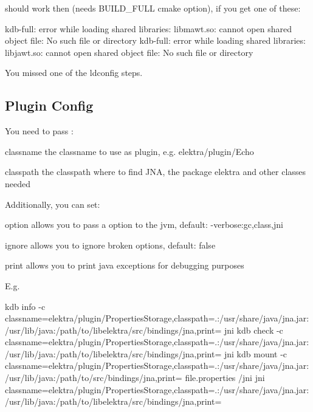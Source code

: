 should work then (needs B\+U\+I\+L\+D\+\_\+\+F\+U\+LL cmake option), if you get one of these\+: \begin{DoxyVerb}kdb-full: error while loading shared libraries: libmawt.so: cannot open shared object file: No such file or directory
kdb-full: error while loading shared libraries: libjawt.so: cannot open shared object file: No such file or directory
\end{DoxyVerb}


You missed one of the ldconfig steps.

\subsection*{Plugin Config}

You need to pass \+:
\begin{DoxyItemize}
\item classname the classname to use as plugin, e.\+g. {\ttfamily elektra/plugin/\+Echo}
\item classpath the classpath where to find J\+NA, the package elektra and other classes needed
\end{DoxyItemize}

Additionally, you can set\+:


\begin{DoxyItemize}
\item option allows you to pass a option to the jvm, default\+: {\ttfamily -\/verbose\+:gc,class,jni}
\item ignore allows you to ignore broken options, default\+: {\ttfamily false}
\item print allows you to print java exceptions for debugging purposes
\end{DoxyItemize}

E.\+g. \begin{DoxyVerb}kdb info -c classname=elektra/plugin/PropertiesStorage,classpath=.:/usr/share/java/jna.jar:/usr/lib/java:/path/to/libelektra/src/bindings/jna,print= jni
kdb check -c classname=elektra/plugin/PropertiesStorage,classpath=.:/usr/share/java/jna.jar:/usr/lib/java:/path/to/libelektra/src/bindings/jna,print= jni
kdb mount -c classname=elektra/plugin/PropertiesStorage,classpath=.:/usr/share/java/jna.jar:/usr/lib/java:/path/to/src/bindings/jna,print= file.properties /jni jni classname=elektra/plugin/PropertiesStorage,classpath=.:/usr/share/java/jna.jar:/usr/lib/java:/path/to/libelektra/src/bindings/jna,print=
\end{DoxyVerb}


